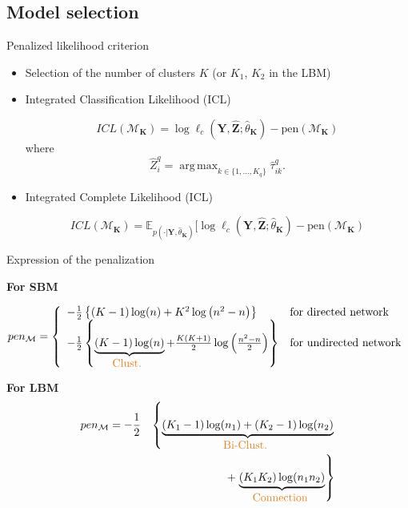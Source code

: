 \documentclass[compress,10pt]{beamer}
\DeclareMathOperator*{\argmax}{arg\,max}
\newcommand{\pen}{\mathrm{pen}}
\newcommand{\bY}{\mathbf{Y}}
\newcommand{\M}{\mathcal{M}_{\bK}}
\newcommand{\bK}{\mathbf{K}}
\newcommand{\Xall}{\mathbf{Y}}
\newcommand{\bZ}{\mathbf{Z}}
\begin{document}
 \subsection{Model selection}
 \begin{frame}{ Penalized likelihood criterion}

 \begin{itemize}
 \item  Selection of the number of clusters  $K$ (or $K_1$, $K_2$ in the LBM)
\item   Integrated Classification Likelihood (ICL)   \textcolor{mygreen}{\cite{biernacki2000assessing}}
 

\begin{equation}\label{eq:ICL}
ICL(\M) =\log  \ell_c(\Xall,\hat{\bZ}; \hat \theta_{\bK})-  \pen(\M)
\end{equation}
 where  \begin{equation}\label{eq:Zhat}
\hat{Z}_i ^q = \argmax_{k \in \{1, \dots, K_q\}}  \hat{\tau}_{ik}^q. 
\end{equation} 
\item   Integrated Complete Likelihood (ICL)  %

 

\begin{equation}\label{eq:ICL}
ICL(\M) =\mathbb{E}_{p(\cdot | \bY, \hat \theta_{\bK})}[\log  \ell_c(\Xall,\hat{\bZ}; \hat \theta_{\bK})-  \pen(\M)
\end{equation}
 \end{itemize}

\end{frame}


 \begin{frame}{Expression of the penalization}
 
\textcolor{dgreen}{ \textbf{For SBM } }

$$ pen_{\mathcal{M}} = \left\{ 
\begin{array}{ll}
- \frac{1}{2}\left\{ (K-1)\log(n)  +K^2   \log \left( n^2-n \right)\right\} & \mbox{for directed network}\\
 - \frac{1}{2}\left\{ \underbrace{(K-1)\log(n) }_{\mbox{\textcolor{dgreen}{Clust. }}} + \frac{K(K+1)}{2}   \log \left(\frac{ n^2-n }{2}\right)\right\} & \mbox{for undirected network}\\
\end{array}
\right.
$$
 

\textcolor{dgreen}{ \textbf{For LBM } }
%
\begin{eqnarray*}
 pen_{\mathcal{M}} =  -  \frac{1}{2}&& \left\{  \underbrace{ (K_1-1)\log(n_1) +  (K_2-1)\log(n_2)  }_{\mbox{\textcolor{dgreen}{Bi-Clust. }}} \right. \\
& &  + \left. \underbrace{ (K_1  K_2)    \log ( n_1   n_2)} _{\mbox{\textcolor{dgreen}{Connection }}} \right\} 
 \end{eqnarray*}

\end{frame}
 
\end{document}
